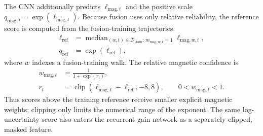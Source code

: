 \documentclass[conference]{IEEEtran}
\begin{document}
The CNN additionally predicts $\ell_{\mathrm{mag},t}$ and the positive scale $q_{\mathrm{mag},t}=\exp(\ell_{\mathrm{mag},t})$. Because fusion uses only relative reliability, the reference score is computed from the fusion-training trajectories:
\begin{equation}
\begin{aligned}
\ell_{\mathrm{ref}}
&=\operatorname{median}_{(w,t)\in\mathcal{D}_{\mathrm{train}}:\,m_{\mathrm{mag},w,t}=1}
\ell_{\mathrm{mag},w,t},\\
q_{\mathrm{ref}}&=\exp(\ell_{\mathrm{ref}}),
\end{aligned}
\label{eq:mag_ref}
\end{equation}
where $w$ indexes a fusion-training walk. The relative magnetic confidence is
\begin{equation}
\begin{aligned}
w_{\mathrm{mag},t}
&=\frac{1}{1+\exp(r_t)},\\
r_t
&=\operatorname{clip}(\ell_{\mathrm{mag},t}-\ell_{\mathrm{ref}},-8,8),
\qquad 0<w_{\mathrm{mag},t}<1.
\end{aligned}
\label{eq:mag_weight}
\end{equation}
Thus scores above the training reference receive smaller explicit magnetic weights; clipping only limits the numerical range of the exponent. The same log-uncertainty score also enters the recurrent gain network as a separately clipped, masked feature.
\end{document}
